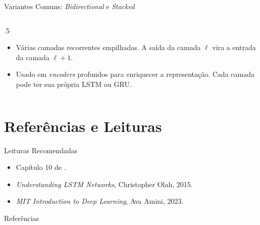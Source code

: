 \documentclass[aspectratio=169,xcolor=dvipsnames]{beamer}
\begin{document}
\begin{frame}{Variantes Comuns: \textit{Bidirectional} e \textit{Stacked}}
\begin{columns}
\begin{column}{.5\linewidth}
{        }
        \begin{itemize}\scriptsize
            \item Várias camadas recorrentes empilhadas. A saída da camada $\ell$ vira a entrada da camada $\ell+1$.
            \item Usado em \textit{encoders} profundos para enriquecer a representação. Cada camada pode ter sua própria LSTM ou GRU.
        \end{itemize}
    \end{column}
\end{columns}
\end{frame}

\section*{Referências e Leituras}

\begin{frame}{Leituras Recomendadas}
    \leiturasize
    \begin{itemize}
        \item Capítulo 10 de .
        \item \textit{Understanding LSTM Networks}, Christopher Olah, 2015.
        \item \textit{MIT Introduction to Deep Learning}, Ava Amini, 2023.
    \end{itemize}
\end{frame}

\begin{frame}[allowframebreaks]{Referências}
    \sloppy
    \printbibliography[heading=none]
\end{frame}
\end{document}
